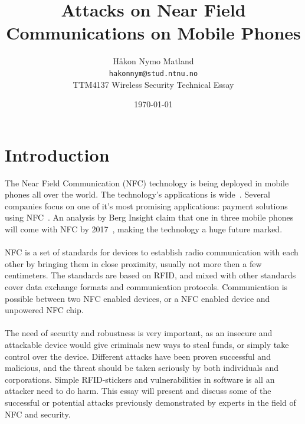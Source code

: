 \documentclass[a4paper,11pt]{article}
\title{Attacks on Near Field Communications on Mobile Phones}
\author{Håkon Nymo Matland \\
	\texttt{hakonnym@stud.ntnu.no}\\
	TTM4137 Wireless Security Technical Essay}
\date{\today}
\begin{document}
\maketitle


\section{Introduction}
The Near Field Communication (NFC) technology is being deployed in mobile phones all over the world. The technology's applications is wide~\cite{remedios2006nfc}. Several companies focus on one of it's most promising applications: payment solutions using NFC~\cite{tan2013}. An analysis by Berg Insight claim that one in three mobile phones will come with NFC by 2017~\cite{nfc_growth}, making the technology a huge future marked.

\paragraph{}NFC is a set of standards for devices to establish radio communication with each other by bringing them in close proximity, usually not more then a few centimeters. The standards are based on RFID, and mixed with other standards cover data exchange formats and communication protocols. Communication is possible between two NFC enabled devices, or a NFC enabled device and unpowered NFC chip.


\paragraph{}The need of security and robustness is very important, as an insecure and attackable device would give criminals new ways to steal funds, or simply take control over the device. Different attacks have been proven successful and malicious, and the threat should be taken seriously by both individuals and corporations. Simple RFID-stickers and vulnerabilities in software is all an attacker need to do harm. This essay will present and discuss some of the successful or potential attacks previously demonstrated by experts in the field of NFC and security.
\end{document}
